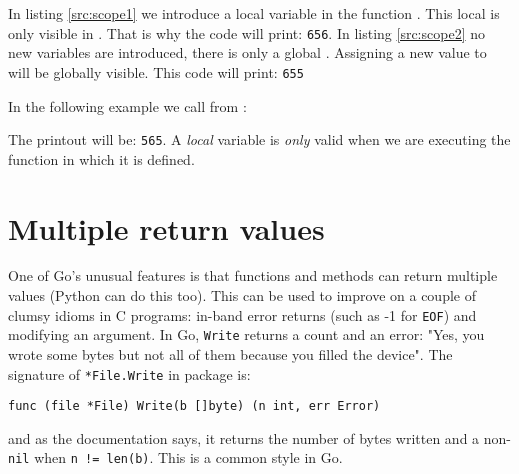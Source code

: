 \begin{minipage}{.5\textwidth}

\hfill
\vfill
\end{minipage}
\hfill
\begin{minipage}{.5\textwidth}

\hfill
\vfill
\end{minipage}

In listing \ref{src:scope1} we introduce a local variable 
in the function .
This local  is only visible in . That is
why the code will print: \texttt{656}.
In listing \ref{src:scope2} no new variables are introduced, there
is only a global .
Assigning a new value to will be globally visible. This code will
print: \texttt{655}

In the following example we call  from :



The printout will be: \texttt{565}. A \emph{local} variable is \emph{only}
valid when we are executing the function in which it is defined. 

\section{Multiple return values}
\label{sec:multiple return}
One of Go's unusual features is that functions and methods can return multiple
values (Python can do this too). This can be used to improve on a couple of 
clumsy idioms in C programs:
in-band error returns (such as -1 for \texttt{EOF}) and modifying an argument.
In Go, \lstinline{Write} returns a count and an
error: "Yes, you wrote some bytes but not all of them because you filled the
device". The signature of \lstinline{*File.Write} in package
 is:
\begin{lstlisting}
func (file *File) Write(b []byte) (n int, err Error)
\end{lstlisting}
and as the documentation says, it returns the number of bytes written and a
non-\lstinline{nil}  when \lstinline{n != len(b)}. This is a common
style in Go.

